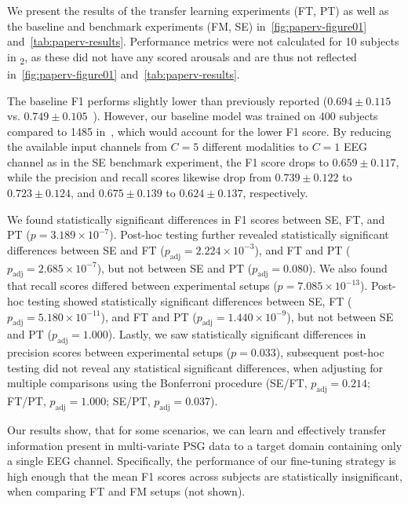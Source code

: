 We present the results of the transfer learning experiments (FT, PT) as well as the baseline and benchmark experiments (FM, SE) in~\cref{fig:paperv-figure01} and~\cref{tab:paperv-results}. 
Performance metrics were not calculated for \num{10} subjects in \test{}\textsubscript{2}, as these did not have any scored arousals and are thus not reflected in~\cref{fig:paperv-figure01} and~\cref{tab:paperv-results}.

The baseline F1 performs slightly lower than previously reported ($0.694 \pm 0.115$ vs. $0.749 \pm 0.105$~\cite{Olesen2019}).
However, our baseline model was trained on \num{400} subjects compared to \num{1485} in~\cite{Olesen2019}, which would account for the lower F1 score. 
By reducing the available input channels from $C=5$ different modalities to $C=1$ \ac{EEG} channel as in the SE benchmark experiment, the F1 score drops to $0.659 \pm 0.117$, while the precision and recall scores likewise drop from $0.739 \pm 0.122$ to $0.723 \pm 0.124$, and $0.675 \pm 0.139$ to $0.624 \pm 0.137$, respectively.

We found statistically significant differences in F1 scores between SE, FT, and PT ($p=3.189\times 10^{-7}$). 
Post-hoc testing further revealed statistically significant differences between SE and FT ($p_{\mathrm{adj}}=2.224 \times 10^{-3}$), and FT and PT ($p_{\mathrm{adj}}=2.685 \times 10^{-7}$), but not between SE and PT  ($p_{\mathrm{adj}}=0.080$). 
We also found that recall scores differed between experimental setups ($p=7.085 \times 10^{-13}$).
Post-hoc testing showed statistically significant differences between SE, FT ($p_{\mathrm{adj}}=5.180 \times 10^{-11}$), and FT and PT ($p_{\mathrm{adj}}=1.440 \times 10^{-9}$), but not between SE and PT ($p_{\mathrm{adj}}=1.000$).
Lastly, we saw statistically significant differences in precision scores between experimental setups ($p=0.033$), subsequent post-hoc testing did not reveal any statistical significant differences, when adjusting for multiple comparisons using the Bonferroni procedure (SE/FT, $p_{\mathrm{adj}}=0.214$; FT/PT, $p_{\mathrm{adj}}=1.000$; SE/PT, $p_{\mathrm{adj}}=0.037$).

Our results show, that for some scenarios, we can learn and effectively transfer information present in multi-variate \ac{PSG} data to a target domain containing only a single \ac{EEG} channel.
Specifically, the performance of our fine-tuning strategy is high enough that the mean F1 scores across subjects are statistically insignificant, when comparing FT and FM setups (not shown).

